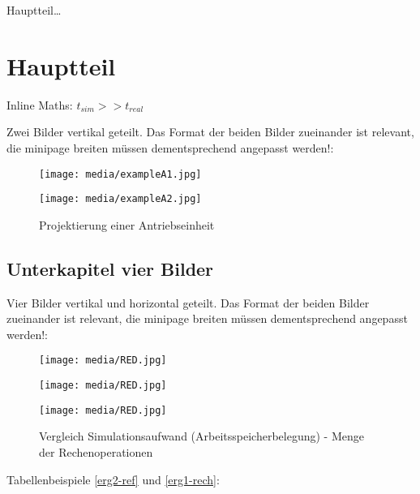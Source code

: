 
Hauptteil\ldots

\section{Hauptteil}
Inline Maths: $t_{sim} >> t_{real}$

Zwei Bilder vertikal geteilt. Das Format der beiden Bilder zueinander ist relevant, die minipage breiten
müssen dementsprechend angepasst werden!:
\begin{figure}[h]
  \hfill
  \begin{minipage}[t]{0.65\textwidth}
    \texttt{[image: media/exampleA1.jpg]}
  \end{minipage}
  \hfill
  \begin{minipage}[t]{0.3\textwidth}
    \texttt{[image: media/exampleA2.jpg]}
  \end{minipage}
  \hfill
  \captionsetup{width=0.8\textwidth}
  \caption[Projektierung]{Projektierung einer Antriebseinheit}
  \label{antrieb1}
  \vspace{-0.4cm}
\end{figure}

\newpage

\subsection{Unterkapitel vier Bilder}

Vier Bilder vertikal und horizontal geteilt. Das Format der beiden Bilder zueinander ist relevant, die minipage breiten
müssen dementsprechend angepasst werden!:
\begin{figure}[h]
  \hfill
  \begin{minipage}[t]{0.49\textwidth}
    \texttt{[image: media/RED.jpg]}
  \end{minipage}
  \hfill
  \begin{minipage}[t]{0.49\textwidth}
    \texttt{[image: media/RED.jpg]}
  \end{minipage}
  \hfill

  \vspace{0.01\textwidth}

  \hfill
  \begin{minipage}[b]{0.49\textwidth}
    \texttt{[image: media/RED.jpg]}
  \end{minipage}
  \hfill
  \begin{minipage}[b]{0.49\textwidth}
  \end{minipage}
  \hfill

  \captionsetup{width=0.8\textwidth}
  \caption[Vergleich Arbeitsspeicherbelegung - Rechenoperationen]{Vergleich Simulationsaufwand (Arbeitsspeicherbelegung) - Menge der Rechenoperationen}
  \label{vergleich1dot5}
  \vspace{-0.4cm}
\end{figure}
Tabellenbeispiele \ref{erg2-ref} und \ref{erg1-rech}:

